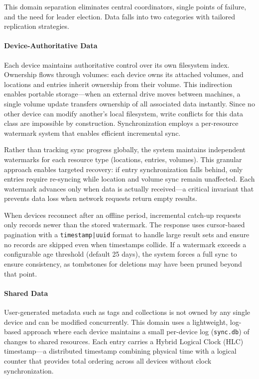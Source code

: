 \documentclass[sigconf]{acmart}
\begin{document}
This domain separation eliminates central coordinators, single points of failure, and the need for leader election. Data falls into two categories with tailored replication strategies.

\paragraph{Device-Authoritative Data}

Each device maintains authoritative control over its own filesystem index. Ownership flows through volumes: each device owns its attached volumes, and locations and entries inherit ownership from their volume. This indirection enables portable storage---when an external drive moves between machines, a single volume update transfers ownership of all associated data instantly. Since no other device can modify another's local filesystem, write conflicts for this data class are impossible by construction. Synchronization employs a per-resource watermark system that enables efficient incremental sync.

Rather than tracking sync progress globally, the system maintains independent watermarks for each resource type (locations, entries, volumes). This granular approach enables targeted recovery: if entry synchronization falls behind, only entries require re-syncing while location and volume sync remain unaffected. Each watermark advances only when data is actually received---a critical invariant that prevents data loss when network requests return empty results.

When devices reconnect after an offline period, incremental catch-up requests only records newer than the stored watermark. The response uses cursor-based pagination with a \texttt{timestamp|uuid} format to handle large result sets and ensure no records are skipped even when timestamps collide. If a watermark exceeds a configurable age threshold (default 25 days), the system forces a full sync to ensure consistency, as tombstones for deletions may have been pruned beyond that point.

\paragraph{Shared Data}

User-generated metadata such as tags and collections is not owned by any single device and can be modified concurrently. This domain uses a lightweight, log-based approach where each device maintains a small per-device log (\texttt{sync.db}) of changes to shared resources. Each entry carries a Hybrid Logical Clock (HLC) timestamp---a distributed timestamp combining physical time with a logical counter that provides total ordering across all devices without clock synchronization.
\end{document}
